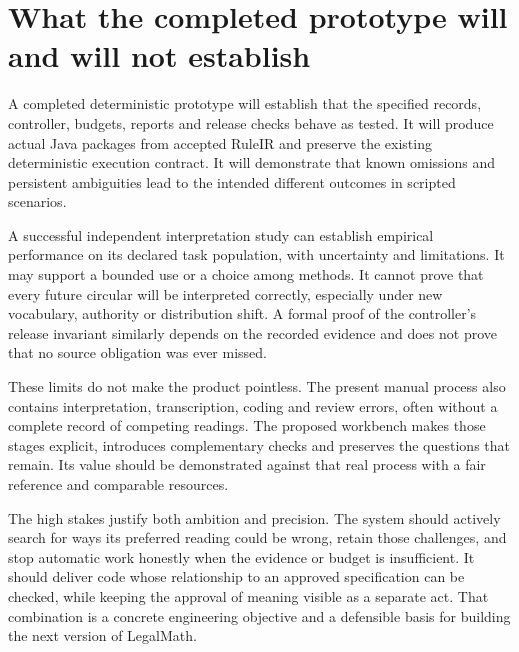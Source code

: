 \documentclass[12pt,a4paper,oneside,openany]{book}
\begin{document}
\section{What the completed prototype will and will not establish}
\label{merge:M10:15}


A completed deterministic prototype will establish that the specified records,
controller, budgets, reports and release checks behave as tested. It will produce
actual Java packages from accepted RuleIR and preserve the existing deterministic
execution contract. It will demonstrate that known omissions and persistent
ambiguities lead to the intended different outcomes in scripted scenarios.

A successful independent interpretation study can establish empirical performance
on its declared task population, with uncertainty and limitations. It may support
a bounded use or a choice among methods. It cannot prove that every future
circular will be interpreted correctly, especially under new vocabulary,
authority or distribution shift. A formal proof of the controller's release
invariant similarly depends on the recorded evidence and does not prove that no
source obligation was ever missed.

These limits do not make the product pointless. The present manual process also
contains interpretation, transcription, coding and review errors, often without a
complete record of competing readings. The proposed workbench makes those stages
explicit, introduces complementary checks and preserves the questions that remain.
Its value should be demonstrated against that real process with a fair reference
and comparable resources.

The high stakes justify both ambition and precision. The system should actively
search for ways its preferred reading could be wrong, retain those challenges,
and stop automatic work honestly when the evidence or budget is insufficient.
It should deliver code whose relationship to an approved specification can be
checked, while keeping the approval of meaning visible as a separate act.
That combination is a concrete engineering objective and a defensible basis for
building the next version of LegalMath.


\backmatter
\begingroup
\raggedright


\endgroup
\end{document}
